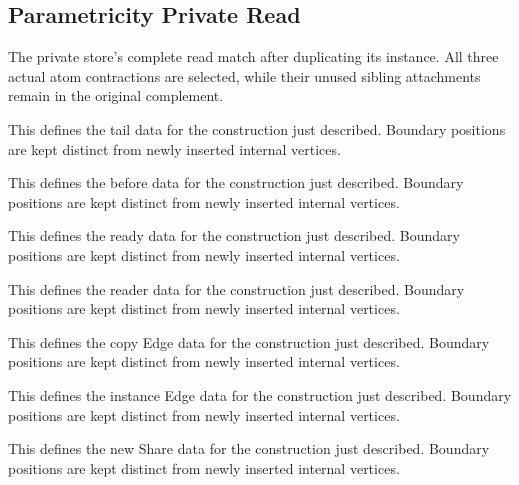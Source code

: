 \subsection{Parametricity Private Read}
The private store's complete read match after duplicating its instance. All three actual atom contractions are selected, while their unused sibling attachments remain in the original complement.

This defines the tail data for the construction just described. Boundary positions are kept distinct from newly inserted internal vertices.
\par{}

This defines the before data for the construction just described. Boundary positions are kept distinct from newly inserted internal vertices.
\par{}

This defines the ready data for the construction just described. Boundary positions are kept distinct from newly inserted internal vertices.
\par{}

This defines the reader data for the construction just described. Boundary positions are kept distinct from newly inserted internal vertices.
\par{}

This defines the copy Edge data for the construction just described. Boundary positions are kept distinct from newly inserted internal vertices.
\par{}

This defines the instance Edge data for the construction just described. Boundary positions are kept distinct from newly inserted internal vertices.
\par{}

This defines the new Share data for the construction just described. Boundary positions are kept distinct from newly inserted internal vertices.
\par{}

